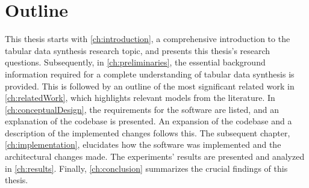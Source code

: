 \section{Outline}
\label{ch:intro-outline}

This thesis starts with \autoref{ch:introduction}, a comprehensive introduction to the tabular data synthesis research topic, and presents this thesis's research questions.
Subsequently, in \autoref{ch:preliminaries}, the essential background information required for a complete understanding of tabular data synthesis is provided.
This is followed by an outline of the most significant related work in \autoref{ch:relatedWork}, which highlights relevant models from the literature.
In \autoref{ch:conceptualDesign}, the requirements for the software are listed, and an explanation of the codebase is presented. 
An expansion of the codebase and a description of the implemented changes follows this. 
The subsequent chapter, \autoref{ch:implementation}, elucidates how the software was implemented and the architectural changes made.
The experiments' results are presented and analyzed in \autoref{ch:results}. 
Finally, \autoref{ch:conclusion} summarizes the crucial findings of this thesis.
